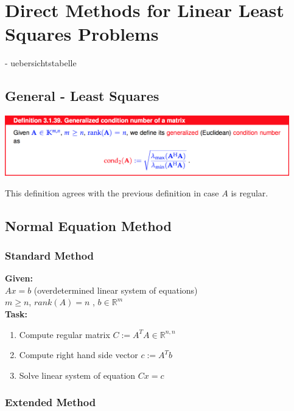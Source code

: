 \documentclass[12pt, a4paper]{article}
\newcommand{\R}{\mathbb{R}}
\begin{document}
\section{Direct Methods for Linear Least Squares Problems}

- uebersichtstabelle

\subsection{General - Least Squares}

\begin{center}
	\includegraphics[width=350pt]{cond.png}
\end{center}

This definition agrees with the previous definition in case $A$ is regular.

\subsection{Normal Equation Method}

\subsubsection{Standard Method}

\begin{tcolorbox}
\textbf{Given:}\\
$Ax = b$ (overdetermined linear system of equations) \\
$m \geq n$, $rank(A)=n$ ,  $b \in \R^{m}$\vspace{2mm}\\
\textbf{Task:} \vspace{-2mm}
\begin{enumerate}[noitemsep]
	\item Compute regular matrix $C := A^TA \in \R^{n,n}$
	\item Compute right hand side vector $c := A^Tb$
	\item Solve linear system of equation $Cx = c$
\end{enumerate}
\end{tcolorbox}

\subsubsection{Extended Method}
\end{document}
